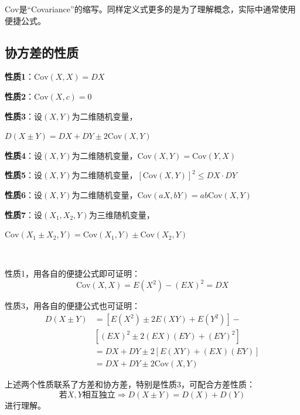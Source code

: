 \begin{tcolorbox}
$\mathrm{Cov}$是“Covariance”的缩写。同样定义式更多的是为了理解概念，实际中通常使用便捷公式。
\end{tcolorbox}

\subsection{协方差的性质}

{\bf 性质1}：$\mathrm{Cov}\left( X,X \right) =DX$

{\bf 性质2}：$\mathrm{Cov}\left( X,c \right) =0$

{\bf 性质3}：设$\left( X,Y \right) $为二维随机变量，

$D\left( X\pm Y \right) =DX+DY\pm 2\mathrm{Cov}\left( X,Y \right) $

{\bf 性质4}：设$\left( X,Y \right) $为二维随机变量，$\mathrm{Cov}\left( X,Y \right) =\mathrm{Cov}\left( Y,X \right) $

{\bf 性质5}：设$\left( X,Y \right) $为二维随机变量，$\left[ \mathrm{Cov}\left( X,Y \right) \right] ^2\leqslant DX\cdot DY$

{\bf 性质6}：设$\left( X,Y \right) $为二维随机变量，$\mathrm{Cov}\left( aX,bY \right) =ab\mathrm{Cov}\left( X,Y \right) $

{\bf 性质7}：设$\left( X_1,X_2,Y \right) $为三维随机变量，

$\mathrm{Cov}\left( X_1\pm X_2,Y \right) =\mathrm{Cov}\left( X_1,Y \right) \pm \mathrm{Cov}\left( X_2,Y \right) $

~

性质1，用各自的便捷公式即可证明：
\[
\mathrm{Cov}\left( X,X \right) =E\left( X^2 \right) -\left( EX \right) ^2=DX
\]

性质3，用各自的便捷公式也可证明：
\begin{align*}
D\left( X\pm Y \right) &=\left[ E\left( X^2 \right) \pm 2E\left( XY \right) +E\left( Y^2 \right) \right] - \\
&\left[ \left( EX \right) ^2\pm 2\left( EX \right) \left( EY \right) +\left( EY \right) ^2 \right] \\
&=DX+DY\pm 2\left[ E\left( XY \right) +\left( EX \right) \left( EY \right) \right] \\
&=DX+DY\pm 2\mathrm{Cov}\left( X,Y \right)
\end{align*}

\begin{tcolorbox}
上述两个性质联系了方差和协方差，特别是性质3，可配合方差性质：
\[
\text{若}X,Y\text{相互独立}\Rightarrow D\left( X\pm Y \right) =D\left( X \right) +D\left( Y \right)
\]
进行理解。
\end{tcolorbox}

